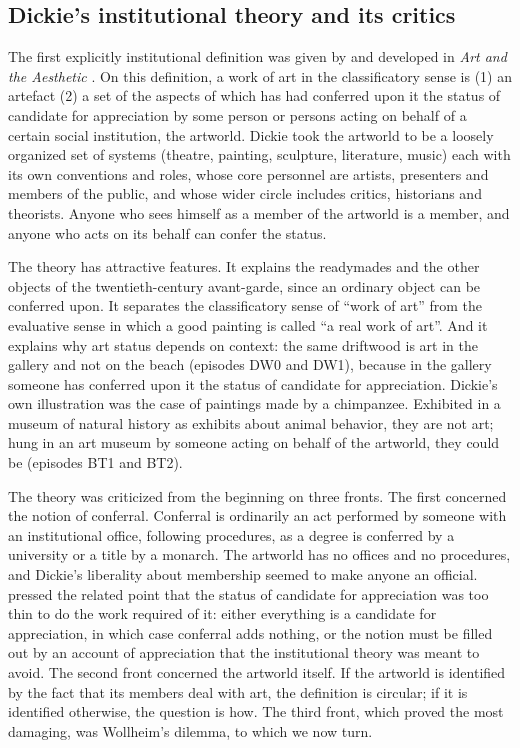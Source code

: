 \documentclass{situationist-preprint}
\begin{document}
\subsection{Dickie's institutional theory and its critics}

The first explicitly institutional definition was given by \citet{Dickie1969} and developed in \emph{Art and the Aesthetic} \citep{Dickie1974}. On this definition, a work of art in the classificatory sense is (1) an artefact (2) a set of the aspects of which has had conferred upon it the status of candidate for appreciation by some person or persons acting on behalf of a certain social institution, the artworld. Dickie took the artworld to be a loosely organized set of systems (theatre, painting, sculpture, literature, music) each with its own conventions and roles, whose core personnel are artists, presenters and members of the public, and whose wider circle includes critics, historians and theorists. Anyone who sees himself as a member of the artworld is a member, and anyone who acts on its behalf can confer the status.

The theory has attractive features. It explains the readymades and the other objects of the twentieth-century avant-garde, since an ordinary object can be conferred upon. It separates the classificatory sense of \enquote{work of art} from the evaluative sense in which a good painting is called \enquote{a real work of art}. And it explains why art status depends on context: the same driftwood is art in the gallery and not on the beach (episodes DW0 and DW1), because in the gallery someone has conferred upon it the status of candidate for appreciation. Dickie's own illustration was the case of paintings made by a chimpanzee. Exhibited in a museum of natural history as exhibits about animal behavior, they are not art; hung in an art museum by someone acting on behalf of the artworld, they could be (episodes BT1 and BT2).

The theory was criticized from the beginning on three fronts. The first concerned the notion of conferral. Conferral is ordinarily an act performed by someone with an institutional office, following procedures, as a degree is conferred by a university or a title by a monarch. The artworld has no offices and no procedures, and Dickie's liberality about membership seemed to make anyone an official. \citet{Cohen1973} pressed the related point that the status of candidate for appreciation was too thin to do the work required of it: either everything is a candidate for appreciation, in which case conferral adds nothing, or the notion must be filled out by an account of appreciation that the institutional theory was meant to avoid. The second front concerned the artworld itself. If the artworld is identified by the fact that its members deal with art, the definition is circular; if it is identified otherwise, the question is how. The third front, which proved the most damaging, was Wollheim's dilemma, to which we now turn.
\end{document}
